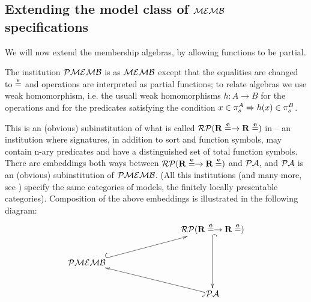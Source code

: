 \documentclass[10pt]{article}
\begin{document}
\subsection{Extending the model class of ${\mathcal{MEMB}}$ specifications}
We will now extend the membership algebras, by allowing
functions to be partial.
\begin{definition}
The institution ${\mathcal{PMEMB}}$ is as ${\mathcal{MEMB}}$ except that the equalities are
changed to $\stackrel{e}{=}$ and operations are interpreted as partial functions; to
relate algebras we use weak homomorphism, i.e. the usuall weak homomorphisms
$h:A\to B$ for the operations
and for the predicates satisfying the condition $x \in \pi_s^A \Rightarrow h(x)
\in \pi_s^B$.
\end{definition}
%
This is an (obvious) subinstitution of what is called ${{\mathcal{RP}}(\bf{R\stackrel{e}{=}\to R\stackrel{e}{=}})}$ in \cite{mossa} -- an institution where signatures, in addition
to sort and function symbols, may contain n-ary predicates and have a distinguished set
of total function symbols. There are embeddings both ways between
${{\mathcal{RP}}(\bf{R\stackrel{e}{=}\to R\stackrel{e}{=}})}$ and ${\mathcal{PA}}$, and ${\mathcal{PA}}$ is
an (obvious) subinstitution of ${\mathcal{PMEMB}}$. (All this institutions (and many
more, see \cite{mossa}) specify the same categories of models, the finitely
locally presentable categories). Composition of the above embeddings is
illustrated in the following diagram:
\[
\xymatrix{	&&& \inst{\inst{RP}(\bf{R\eeq \to R\eeq})} \ar@{^{(}->}[dd] \\
	\inst{PMEMB} \ar@{^{(}->}[rrru]\\ 
		&&& \inst{PA} \ar@{^{(}->}[lllu]\\
} 
\] 
\end{document}
